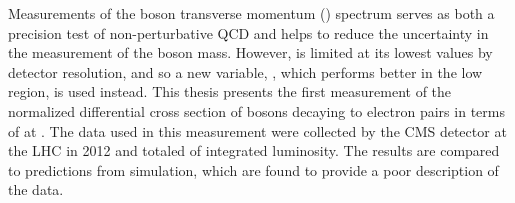 
Measurements of the \Z boson transverse momentum (\bosonpt) spectrum serves as
both a precision test of non-perturbative QCD and helps to reduce the
uncertainty in the measurement of the \W boson mass. However, \bosonpt is
limited at its lowest values by detector resolution, and so a new variable,
\phistar, which performs better in the low \bosonpt region, is used instead.
This thesis presents the first measurement of the normalized differential cross
section of \Z bosons decaying to electron pairs in terms of \phistar at
\rootseight. The data used in this measurement were collected by the CMS
detector at the LHC in 2012 and totaled \GoodLumiNumber of integrated
luminosity. The results are compared to predictions from simulation, which are
found to provide a poor description of the data.
